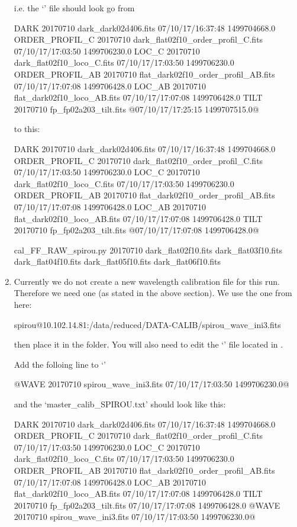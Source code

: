 \begin{enumerate}
\begin{note}
\noindent i.e. the `\masterCALIBDBfile' file should look go from
\begin{textbox}
DARK 20170710 dark_dark02d406.fits 07/10/17/16:37:48 1499704668.0
ORDER_PROFIL_C 20170710 dark_flat02f10_order_profil_C.fits 07/10/17/17:03:50 1499706230.0
LOC_C 20170710 dark_flat02f10_loco_C.fits 07/10/17/17:03:50 1499706230.0
ORDER_PROFIL_AB 20170710 flat_dark02f10_order_profil_AB.fits 07/10/17/17:07:08 1499706428.0
LOC_AB 20170710 flat_dark02f10_loco_AB.fits 07/10/17/17:07:08 1499706428.0
TILT 20170710 fp_fp02a203_tilt.fits @07/10/17/17:25:15 1499707515.0@
\end{textbox}
\noindent to this:
\begin{textbox}
DARK 20170710 dark_dark02d406.fits 07/10/17/16:37:48 1499704668.0
ORDER_PROFIL_C 20170710 dark_flat02f10_order_profil_C.fits 07/10/17/17:03:50 1499706230.0
LOC_C 20170710 dark_flat02f10_loco_C.fits 07/10/17/17:03:50 1499706230.0
ORDER_PROFIL_AB 20170710 flat_dark02f10_order_profil_AB.fits 07/10/17/17:07:08 1499706428.0
LOC_AB 20170710 flat_dark02f10_loco_AB.fits 07/10/17/17:07:08 1499706428.0
TILT 20170710 fp_fp02a203_tilt.fits @07/10/17/17:07:08 1499706428.0@
\end{textbox}
\end{note}

\begin{cmdbox}
cal_FF_RAW_spirou.py 20170710 dark_flat02f10.fits dark_flat03f10.fits dark_flat04f10.fits dark_flat05f10.fits dark_flat06f10.fits
\end{cmdbox}

\newpage

\item Currently we do not create a new wavelength calibration file for this run. Therefore we need one (as stated in the above section). We use the one from here:
\begin{cmdbox}
spirou@10.102.14.81:/data/reduced/DATA-CALIB/spirou_wave_ini3.fits
\end{cmdbox}

\noindent then place it in the  folder. You will also need to edit the `\masterCALIBDBfile' file located in . 

\noindent Add the folloing line to `\masterCALIBDBfile'
\begin{textbox}
@WAVE 20170710 spirou_wave_ini3.fits 07/10/17/17:03:50 1499706230.0@
\end{textbox}

\noindent and the `master\_calib\_SPIROU.txt' should look like this:
\begin{textbox}
DARK 20170710 dark_dark02d406.fits 07/10/17/16:37:48 1499704668.0
ORDER_PROFIL_C 20170710 dark_flat02f10_order_profil_C.fits 07/10/17/17:03:50 1499706230.0
LOC_C 20170710 dark_flat02f10_loco_C.fits 07/10/17/17:03:50 1499706230.0
ORDER_PROFIL_AB 20170710 flat_dark02f10_order_profil_AB.fits 07/10/17/17:07:08 1499706428.0
LOC_AB 20170710 flat_dark02f10_loco_AB.fits 07/10/17/17:07:08 1499706428.0
TILT 20170710 fp_fp02a203_tilt.fits 07/10/17/17:07:08 1499706428.0
@WAVE 20170710 spirou_wave_ini3.fits 07/10/17/17:03:50 1499706230.0@
\end{textbox}


\end{enumerate}
